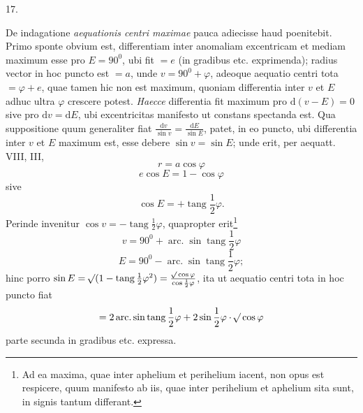 \begin{center}
\hypertarget{native-035-article017}{}17.
\end{center}
De indagatione \emph{aequationis centri maximae} pauca adiecisse haud poenitebit. Primo sponte obvium est, differentiam inter anomaliam excentricam et mediam maximum esse pro $E=90^0$, ubi fit $=e$ (in gradibus etc. exprimenda); radius vector in hoc puncto est $=a$, unde $v=90^0+\varphi$, adeoque aequatio centri tota $=\varphi+e$, quae tamen hic non est maximum, quoniam differentia inter $v$ et $E$ adhuc ultra $\varphi$ crescere potest. \emph{Haecce} differentia fit maximum pro $\mathrm{d}(v-E)=0$ sive pro $\mathrm{d}v=\mathrm{d}E$, ubi excentricitas manifesto ut constans spectanda est. Qua suppositione quum generaliter fiat $\frac{\mathrm{d}v}{\sin v}=\frac{\mathrm{d}E}{\sin E}$, patet, in eo puncto, ubi differentia inter $v$ et $E$ maximum est, esse debere $\sin v=\sin E$; unde erit, per aequatt. VIII, III,
\[
r=a\cos\varphi
\]
\[
e\cos E=1-\cos\varphi
\]
sive
\[
\cos E=+\operatorname{tang}\frac{1}{2}\varphi.
\]
Perinde invenitur $\cos v=-\operatorname{tang}\frac{1}{2}\varphi$, quapropter erit\footnote{Ad ea maxima, quae inter aphelium et perihelium iacent, non opus est respicere, quum manifesto ab iis, quae inter perihelium et aphelium sita sunt, in signis tantum differant.}
\[
v=90^0+\operatorname{arc.}\sin\operatorname{tang}\frac{1}{2}\varphi
\]
\[
E=90^0-\operatorname{arc.}\sin\operatorname{tang}\frac{1}{2}\varphi;
\]
hinc porro $\sin E=\mathord{{}^{}\!\surd}(1-\operatorname{tang}\frac{1}{2}\varphi^2)=\frac{\mathord{{}^{}\!\surd}\cos\varphi}{\cos\frac{1}{2}\varphi}$, ita ut aequatio centri tota in hoc puncto fiat
\[
=2\operatorname{arc.}\sin\operatorname{tang}\frac{1}{2}\varphi+2\sin\frac{1}{2}\varphi\cdot\mathord{{}^{}\!\surd}\cos\varphi
\]
parte secunda in gradibus etc. expressa.

